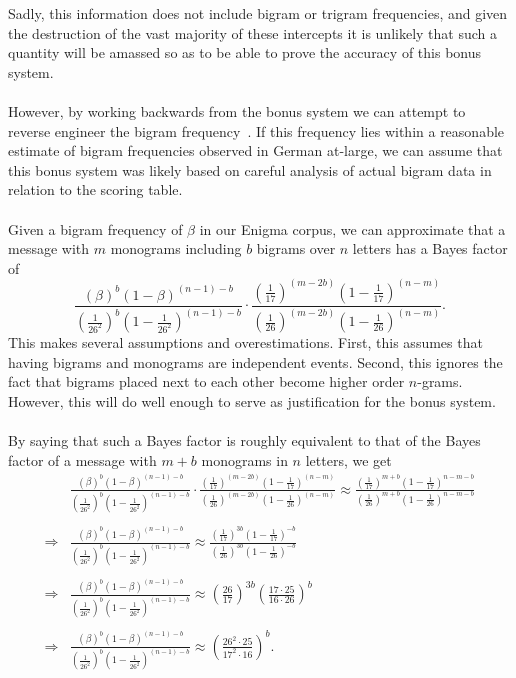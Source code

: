 Sadly, this information does not include bigram or trigram
frequencies, and given the destruction of the vast majority of
these intercepts it
is unlikely that such a quantity will be amassed so as to be able
to prove the accuracy of this bonus system.
\\\\However, by working backwards from the bonus system we can attempt
to reverse engineer the bigram frequency~\cite{cryptoSEBanburismus}. If this frequency lies
within a reasonable estimate of bigram frequencies observed in
German at-large, we can assume that this bonus system was likely
based on careful analysis of actual bigram data in relation to the
scoring table.
\\\\Given a bigram frequency of $\beta$ in our Enigma corpus, we
can approximate that a message with $m$ monograms including $b$
bigrams over $n$ letters has a Bayes factor of
\[
  \frac{(\beta)^b(1-\beta)^{(n-1)-b}}{(\frac{1}{26^2})^b(1-\frac{1}{26^2})^{(n-1)-b}}\cdot\frac{(\frac{1}{17})^{(m-2b)}(1-\frac{1}{17})^{(n-m)}}{(\frac{1}{26})^{(m-2b)}(1-\frac{1}{26})^{(n-m)}}.
\]
This makes several assumptions and overestimations. First, this
assumes that having bigrams and monograms are independent events.
Second, this ignores the fact that bigrams placed next to each
other become higher order $n$-grams. However, this will do well
enough to serve as justification for the bonus system.
\\\\By saying that such a Bayes factor is roughly equivalent to
that of the Bayes factor of a message with $m+b$ monograms in $n$
letters, we get
\begin{align*}
  &
  \frac{(\beta)^b(1-\beta)^{(n-1)-b}}{(\frac{1}{26^2})^b(1-\frac{1}{26^2})^{(n-1)-b}}\cdot\frac{(\frac{1}{17})^{(m-2b)}(1-\frac{1}{17})^{(n-m)}}{(\frac{1}{26})^{(m-2b)}(1-\frac{1}{26})^{(n-m)}}
  \approx
  \frac{(\frac{1}{17})^{m+b}(1-\frac{1}{17})^{n-m-b}}{(\frac{1}{26})^{m+b}(1-\frac{1}{26})^{n-m-b}}
  \\\\
  \Rightarrow &
  \frac{(\beta)^b(1-\beta)^{(n-1)-b}}{(\frac{1}{26^2})^b(1-\frac{1}{26^2})^{(n-1)-b}}\approx
  \frac{(\frac{1}{17})^{3b}(1-\frac{1}{17})^{-b}}{(\frac{1}{26})^{3b}(1-\frac{1}{26})^{-b}}
  \\\\
  \Rightarrow &
  \frac{(\beta)^b(1-\beta)^{(n-1)-b}}{(\frac{1}{26^2})^b(1-\frac{1}{26^2})^{(n-1)-b}}\approx
  (\frac{26}{17})^{3b}(\frac{17\cdot25}{16\cdot26})^b
  \\\\
  \Rightarrow &
  \frac{(\beta)^b(1-\beta)^{(n-1)-b}}{(\frac{1}{26^2})^b(1-\frac{1}{26^2})^{(n-1)-b}}\approx
  (\frac{26^2\cdot25}{17^2\cdot16})^b.
\end{align*}

